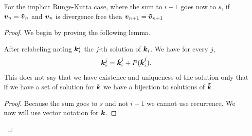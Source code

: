 \begin{theorem}
For the implicit Runge-Kutta case, where the sum to $i-1$ goes now to $s$, if ${\boldsymbol {v}}_{n}={\boldsymbol {\tilde{v}}}_{n}$ and ${\boldsymbol {v}}_n$ is divergence free then ${\boldsymbol {v}}_{n+1}={\boldsymbol {\tilde{v}}}_{n+1}$ 
\end{theorem}
\begin{proof}
We begin by proving the following lemma.
\begin{lemma}
After relabeling noting ${\boldsymbol {k}}_{i}^{j}$ the $j$-th solution of ${\boldsymbol {k}}_{i}$.
We have for every $j$,
\begin{equation}
  {\boldsymbol {k}}_{i}^{j}={\boldsymbol {\tilde{k}}}_{i}^{j}+P({\boldsymbol {\tilde{k}}}_{i}^{j}).
\end{equation}
This does not say that we have existence and uniqueness of the solution only that if we have a set of solution for ${\boldsymbol {k}}$ we have a bijection
to solutions of ${\boldsymbol {\tilde{k}}}$.
\end{lemma}
\begin{proof}
Because the sum goes to $s$ and not $i-1$ we cannot use recurrence.
We now will use vector notation for ${\boldsymbol {k}}$.


\end{proof}
\end{proof}
